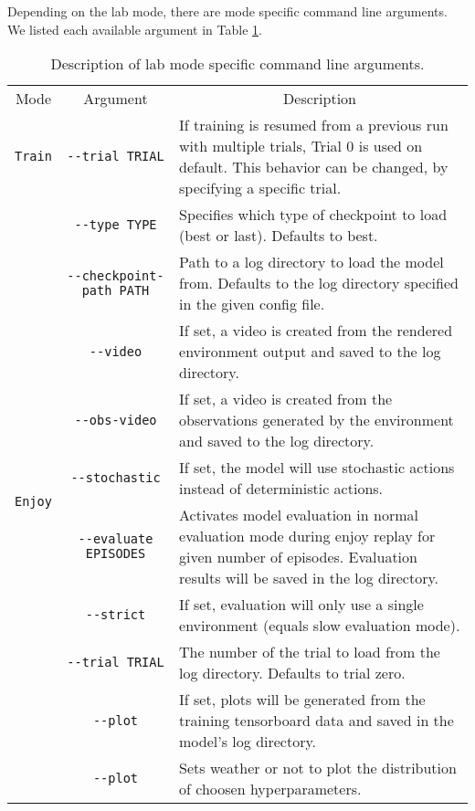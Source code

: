 Depending on the lab mode, there are mode specific command line arguments. We listed each available argument in Table \ref{tab:CommandLineArguments}.

\begin{table}[hp]
    \begin{center}
        \small
        \bgroup
        \def\arraystretch{1.25}%
        \begin{tabular}{|c|c|p{}|}
            \hline
            Mode & Argument & \multicolumn{1}{c|}{Description} \\
            \hhline{|=|=|=|}
            \texttt{Train} & \texttt{-{}-trial TRIAL} & If training is resumed from a previous run with multiple trials, Trial 0 is used on default. This behavior can be changed, by specifying a specific trial. \\
            \hline
            \multirow{15}{*}{\texttt{Enjoy}} & \texttt{-{}-type TYPE} & Specifies which type of checkpoint to load (best or last). Defaults to best. \\
            & \texttt{-{}-checkpoint-path PATH} & Path to a log directory to load the model from. Defaults to the log directory specified in the given config file. \\
            & \texttt{-{}-video} & If set, a video is created from the rendered environment output and saved to the log directory. \\
            & \texttt{-{}-obs-video} & If set, a video is created from the observations generated by the environment and saved to the log directory. \\
            & \texttt{-{}-stochastic} & If set, the model will use stochastic actions instead of deterministic actions. \\
            & \texttt{-{}-evaluate EPISODES} & Activates model evaluation in normal evaluation mode during enjoy replay for given number of episodes. Evaluation results will be saved in the log directory. \\
            & \texttt{-{}-strict} & If set, evaluation will only use a single environment (equals slow evaluation mode). \\
            & \texttt{-{}-trial TRIAL} & The number of the trial to load from the log directory. Defaults to trial zero. \\
            & \texttt{-{}-plot} & If set, plots will be generated from the training tensorboard data and saved in the model's log directory.\\
            \hline
            \texttt{Search} & \texttt{-{}-plot} & Sets weather or not to plot the distribution of choosen hyperparameters. \\
            \hline
        \end{tabular}
        \egroup
    \end{center}
    \vspace*{-1em}
    \caption[Mode Specific Command Line Arguments]{Description of lab mode specific command line arguments.} \label{tab:CommandLineArguments}
    \vspace*{-2em}
\end{table}

